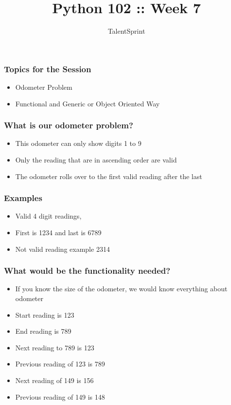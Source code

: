 \documentclass[14pt]{beamer}
\title{Python 102 :: Week 7}
\date{}
\author[TS]{TalentSprint}
\begin{document}
    \begin{frame}
        \titlepage
    \end{frame}
    \begin{frame}
        \frametitle{Topics for the Session}
        \begin{itemize}
            \item Odometer Problem
            \item Functional and Generic or Object Oriented Way
        \end{itemize}
    \end{frame}

    \begin{frame}[containsverbatim]
        \frametitle{What is our odometer problem?}
        \begin{itemize}
        \item This odometer can only show digits 1 to 9
        \item Only the reading that are in ascending order are valid
        \item The odometer rolls over to the first valid reading after the last
        \end{itemize}
    \end{frame}

    \begin{frame}[containsverbatim]
        \frametitle{Examples}
        \begin{itemize}
        \item Valid 4 digit readings, 
        \item First is 1234 and last is 6789
        \item Not valid reading example 2314
        \end{itemize}
    \end{frame}
 
    \begin{frame}[containsverbatim]
        \frametitle{What would be the functionality needed?}
        \begin{itemize}
        \item If you know the size of the odometer, we would know everything about odometer
        \item Start reading is 123
        \item End reading is 789
        \item Next reading to 789 is 123
        \item Previous reading of 123 is 789
        \item Next reading of 149 is 156
        \item Previous reading of 149 is 148
        \end{itemize}
    \end{frame}
\end{document}
